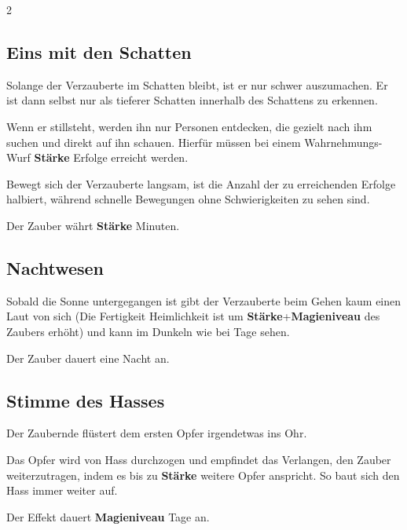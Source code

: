 \begin{multicols*}{2}


\subsection{Eins mit den Schatten}

Solange der Verzauberte im Schatten bleibt, ist er nur schwer auszumachen. Er ist dann selbst nur als tieferer Schatten innerhalb des Schattens zu erkennen.

Wenn er stillsteht, werden ihn nur Personen entdecken, die gezielt nach ihm suchen und direkt auf ihn schauen. Hierfür müssen bei einem Wahrnehmungs-Wurf \textbf{Stärke} Erfolge erreicht werden.

Bewegt sich der Verzauberte langsam, ist die Anzahl der zu erreichenden Erfolge halbiert, während schnelle Bewegungen ohne Schwierigkeiten zu sehen sind.

Der Zauber währt \textbf{Stärke} Minuten.



\subsection{Nachtwesen}

Sobald die Sonne untergegangen ist gibt der Verzauberte beim Gehen kaum einen Laut von sich (Die Fertigkeit Heimlichkeit ist um \textbf{Stärke}+\textbf{Magieniveau} des Zaubers erhöht) und kann im Dunkeln wie bei Tage sehen.

Der Zauber dauert eine Nacht an.



\subsection{Stimme des Hasses}

Der Zaubernde flüstert dem ersten Opfer irgendetwas ins Ohr.

Das Opfer wird von Hass durchzogen und empfindet das Verlangen, den Zauber weiterzutragen, indem es bis zu \textbf{Stärke} weitere Opfer anspricht. So baut sich den Hass immer weiter auf.

Der Effekt dauert \textbf{Magieniveau} Tage an.


\end{multicols*}
